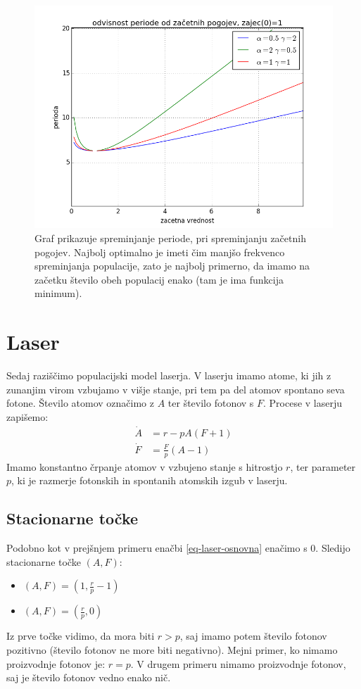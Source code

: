 \documentclass[slovene,11pt,a4paper]{article}
\numberwithin{equation}{section} %
\numberwithin{figure}{section} %
\numberwithin{table}{section} %
\begin{document}
\begin{figure}[h!]
\includegraphics[scale=0.6]{slike/frekvencna_odvisnost.png}
\caption{Graf prikazuje spreminjanje periode, pri spreminjanju začetnih pogojev. Najbolj optimalno je imeti čim manjšo frekvenco spreminjanja populacije, zato je najbolj primerno, da imamo na začetku število obeh populacij enako (tam je ima funkcija minimum).}
\label{fig:prva}
\end{figure}

\pagebreak
\section{Laser}
Sedaj raziščimo populacijski model laserja. V laserju imamo atome, ki jih z zunanjim virom vzbujamo v višje stanje, pri tem pa del atomov spontano seva fotone. Število atomov označimo z $A$ ter število fotonov s $F$. Procese v laserju zapišemo:
\begin{equation}
\label{eq-laser-osnovna}
\begin{aligned}
\dot{A}&=r -p A (F+1) \\
\dot{F}&= \frac{F}{p} (A-1)
\end{aligned}
\end{equation}
Imamo konstantno črpanje atomov v vzbujeno stanje s hitrostjo $r$, ter parameter $p$, ki je razmerje fotonskih in spontanih atomskih izgub v laserju.
\subsection{Stacionarne točke}
Podobno kot v prejšnjem primeru enačbi \ref{eq-laser-osnovna} enačimo s $0$. Sledijo stacionarne točke $(A,F)$:
\begin{itemize}
\item $(A,F)=(1,\frac{r}{p}-1)$
\item $(A,F)=(\frac{r}{p},0)$
\end{itemize}
Iz prve točke vidimo, da mora biti $r>p$, saj imamo potem število fotonov pozitivno (število fotonov ne more biti negativno). Mejni primer, ko nimamo proizvodnje fotonov je: $r=p$. V drugem primeru nimamo proizvodnje fotonov, saj je število fotonov vedno enako nič.
\end{document}
